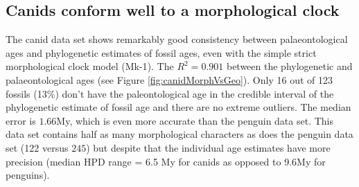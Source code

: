 \documentclass[11pt]{article}
\newcommand{\Mstrict}{{Mk-1}}
\begin{document}




\subsection*{Canids conform well to a morphological clock}

The canid data set shows remarkably good consistency between palaeontological ages and phylogenetic estimates of fossil ages, even with the simple strict morphological clock model (\Mstrict{}).
The $R^2 = 0.901$ between the phylogenetic and palaeontological ages (see Figure \ref{fig:canidMorphVsGeo}). 
Only 16 out of 123 fossils (13\%) don't have the paleontological age in the credible interval of the phylogenetic estimate of fossil age and there are no extreme outliers. 
The median error is $1.66$My, which is even more accurate than the penguin data set.
This data set contains half as many morphological characters as does the penguin data set (122 versus $245$) but despite that the individual age estimates have more precision 
(median HPD range = 6.5 My for canids as opposed to 9.6My for penguins).
\end{document}
